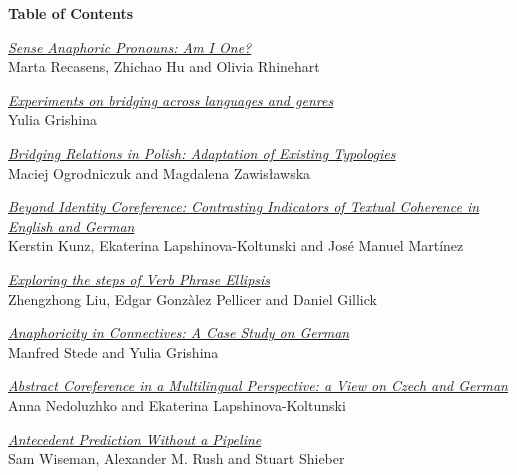 \setlength{\parindent}{0in}
\setlength{\parskip}{2ex}

\begin{center}
  {\Large \bf Table of Contents}
\end{center}

\vspace*{0.5cm}
\hyperlink{page.1}{\em Sense Anaphoric Pronouns: Am I One?}\samepage \\
\hspace*{7mm} Marta Recasens, Zhichao Hu and Olivia Rhinehart\dotfill {}

\hyperlink{page.7}{\em Experiments on bridging across languages and genres}\samepage \\
\hspace*{7mm} Yulia Grishina\dotfill {}

\hyperlink{page.16}{\em Bridging Relations in Polish: Adaptation of Existing Typologies}\samepage \\
\hspace*{7mm} Maciej Ogrodniczuk and Magdalena Zawis{\l}awska\dotfill {}

\hyperlink{page.23}{\em Beyond Identity Coreference: Contrasting Indicators of Textual Coherence in English and German}\samepage \\
\hspace*{7mm} Kerstin Kunz, Ekaterina Lapshinova-Koltunski and Jos\'{e} Manuel Mart\'{i}nez\dotfill {}

\hyperlink{page.32}{\em Exploring the steps of Verb Phrase Ellipsis}\samepage \\
\hspace*{7mm} Zhengzhong Liu, Edgar Gonz\`{a}lez Pellicer and Daniel Gillick\dotfill {}

\hyperlink{page.41}{\em Anaphoricity in Connectives: A Case Study on German}\samepage \\
\hspace*{7mm} Manfred Stede and Yulia Grishina\dotfill {}

\hyperlink{page.47}{\em Abstract Coreference in a Multilingual Perspective: a View on Czech and German}\samepage \\
\hspace*{7mm} Anna Nedoluzhko and Ekaterina Lapshinova-Koltunski\dotfill {}

\hyperlink{page.53}{\em Antecedent Prediction Without a Pipeline}\samepage \\
\hspace*{7mm} Sam Wiseman, Alexander M. Rush and Stuart Shieber\dotfill {}

